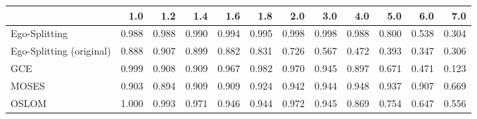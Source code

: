 \begin{tabular}{lrrrrrrrrrrr}
\toprule
{} &   1.0 &   1.2 &   1.4 &   1.6 &   1.8 &   2.0 &   3.0 &   4.0 &   5.0 &   6.0 &   7.0 \\
\midrule
Ego-Splitting            & 0.988 & 0.988 & 0.990 & 0.994 & 0.995 & 0.998 & 0.998 & 0.988 & 0.800 & 0.538 & 0.304 \\
Ego-Splitting (original) & 0.888 & 0.907 & 0.899 & 0.882 & 0.831 & 0.726 & 0.567 & 0.472 & 0.393 & 0.347 & 0.306 \\
GCE                      & 0.999 & 0.908 & 0.909 & 0.967 & 0.982 & 0.970 & 0.945 & 0.897 & 0.671 & 0.471 & 0.123 \\
MOSES                    & 0.903 & 0.894 & 0.909 & 0.909 & 0.924 & 0.942 & 0.944 & 0.948 & 0.937 & 0.907 & 0.669 \\
OSLOM                    & 1.000 & 0.993 & 0.971 & 0.946 & 0.944 & 0.972 & 0.945 & 0.869 & 0.754 & 0.647 & 0.556 \\
\bottomrule
\end{tabular}
